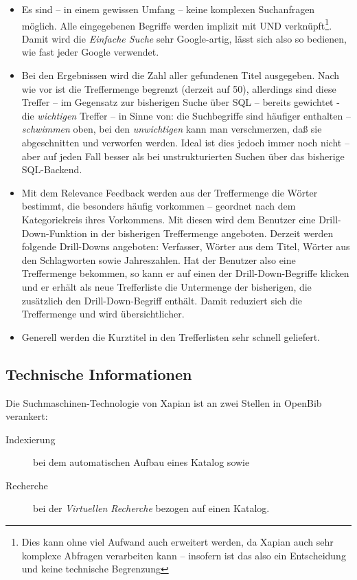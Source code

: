 \documentclass[11pt, twoside, a4paper, BCOR8mm, DIV12, bibtotoc,idxtotoc]{scrbook}
\begin{document}
\begin{itemize}
\item Es sind -- in einem gewissen Umfang -- keine komplexen
  Suchanfragen möglich. Alle ein\-ge\-ge\-be\-nen Begriffe werden implizit mit
  UND verknüpft\footnote{Dies kann ohne viel Aufwand auch erweitert
    werden, da Xapian auch sehr komplexe Abfragen verarbeiten kann --
    insofern ist das also ein Entscheidung und keine technische
    Begrenzung}. Damit wird die \emph{Einfache Suche} sehr Google-artig,
  lässt sich also so bedienen, wie fast jeder Google verwendet.
\item Bei den Ergebnissen wird die Zahl aller gefundenen Titel
  ausgegeben. Nach wie vor ist die Treffermenge begrenzt (derzeit auf
  50), allerdings sind diese Treffer -- im Gegen\-satz zur bisherigen
  Suche über SQL -- bereits gewichtet - die \emph{wichtigen} Treffer
  -- in Sinne von: die Suchbegriffe sind häufiger enthalten --
  \emph{schwimmen} oben, bei den \emph{unwichtigen} kann man
  verschmerzen, daß sie abgeschnitten und verworfen werden. Ideal ist
  dies jedoch immer noch nicht -- aber auf jeden Fall besser als bei
  unstrukturierten Suchen über das bisherige SQL-Backend.
\item Mit dem Relevance Feedback werden aus der Treffermenge die Wörter
bestimmt, die beson\-ders häufig vorkommen -- geordnet nach dem Kategoriekreis
ihres Vorkommens. Mit diesen wird dem Benutzer eine Drill-Down-Funktion in
der bisherigen Treffermenge angeboten. Derzeit werden folgende Drill-Downs
angeboten: Verfasser, Wörter aus dem Titel, Wörter aus den Schlagworten
sowie Jahreszahlen. Hat der Benutzer also eine Treffermenge be\-kom\-men, so
kann er auf einen der Drill-Down-Begriffe klicken und er erhält als neue
Trefferliste die Untermenge der bisherigen, die zusätzlich den
Drill-Down-Begriff enthält. Damit reduziert sich die Treffermenge und wird
übersichtlicher.
\item Generell werden die Kurztitel in den Trefferlisten sehr schnell
geliefert.
\end{itemize}


\subsection{Technische Informationen}

Die Suchmaschinen-Technologie von Xapian ist an zwei Stellen in
OpenBib verankert:

\begin{description}
\item[Indexierung] bei dem automatischen Aufbau eines Katalog sowie
\item[Recherche] bei der \emph{Virtuellen Recherche} bezogen auf einen Katalog.
\end{description}
\end{document}
